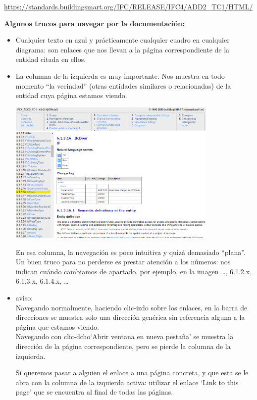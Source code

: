 \documentclass[spanish,10pt,a4paper,final,oneside]{article}
\begin{document}
\url{https://standards.buildingsmart.org/IFC/RELEASE/IFC4/ADD2_TC1/HTML/}

\textbf{Algunos trucos para navegar por la documentación:}

\begin{itemize}

\item Cualquier texto en azul y prácticamente cualquier cuadro en cualquier diagrama: son enlaces que nos llevan a la página correspondiente de la entidad citada en ellos.

\item La columna de la izquierda es muy importante. Nos muestra en todo momento ``la vecindad'' (otras entidades similares o relacionadas) de la entidad cuya página estamos viendo.

\includegraphics[width=0.8\textwidth]{IFC4 - truco - columna vertical de la izquierda}

En esa columna, la navegación es poco intuitiva y quizá demasiado ``plana''. Un buen truco para no perderse es prestar atención a los números: nos indican cuándo cambiamos de apartado, por ejemplo, en la imagen \ldots, 6.1.2.x, 6.1.3.x, 6.1.4.x, \ldots


\item aviso:
\\Navegando normalmente, haciendo clic-izdo sobre los enlaces, en la barra de direcciones se muestra solo una dirección genérica sin referencia alguna a la página que estamos viendo.
\\Navegando con clic-dcho`Abrir ventana en nueva pestaña' se muestra la dirección de la página correspondiente, pero se pierde la columna de la izquierda. 

Si queremos pasar a alguien el enlace a una página concreta, y que esta se le abra con la columna de la izquierda activa: utilizar el enlace `Link to this page' que se encuentra al final de todas las páginas.


\end{itemize}
\end{document}
